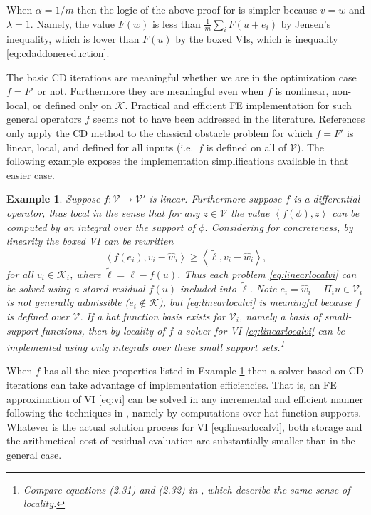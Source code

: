 \documentclass[letterpaper,final,12pt,reqno]{amsart}
\theoremstyle{cstyle}
\theoremstyle{cstyle*}
\theoremstyle{dstyle}
\newtheorem{example}[theorem]{Example}
\numberwithin{equation}{section}
\numberwithin{figure}{section}
\numberwithin{table}{section}
\numberwithin{theorem}{section}
\newcommand{\cK}{\mathcal{K}}
\newcommand{\cV}{\mathcal{V}}
\newcommand{\ip}[2]{\left<#1,#2\right>}
\begin{document}
When $\alpha=1/m$ then the logic of the above proof for  is simpler because $v=w$ and $\lambda=1$.  Namely, the value $F(w)$ is less than $\frac{1}{m} \sum_i F(u+e_i)$ by Jensen's inequality, which is lower than $F(u)$ by the boxed VIs, which is inequality \eqref{eq:cdaddonereduction}.

The basic CD iterations are meaningful whether we are in the optimization case $f=F'$ or not.  Furthermore they are meaningful even when $f$ is nonlinear, non-local, or defined only on $\cK$.  Practical and efficient FE implementation for such general operators $f$ seems not to have been addressed in the literature.  References \cite{GraeserKornhuber2009,Tai2003} only apply the CD method to the classical obstacle problem for which $f=F'$ is linear, local, and defined for all inputs (i.e.~$f$ is defined on all of $\mathcal{V}$).  The following example exposes the implementation simplifications available in that easier case.

\begin{example}  \label{ex:fnice} Suppose $f:\cV \to \cV'$ is linear.  Furthermore suppose $f$ is a differential operator, thus local in the sense that for any $z\in\mathcal{V}$ the value $\ip{f(\phi)}{z}$ can be computed by an integral over the support of $\phi$.  Considering  for concreteness, by linearity the boxed VI can be rewritten
\begin{equation}
\ip{f(e_i)}{v_i-\hat w_i} \ge \ip{\tilde\ell}{v_i-\hat w_i}, \label{eq:linearlocalvi}
\end{equation}
for all $v_i \in \mathcal{K}_i$, where $\tilde\ell = \ell - f(u)$.  Thus each problem \eqref{eq:linearlocalvi} can be solved using a stored residual $f(u)$ included into $\tilde\ell$.  Note $e_i = \hat w_i - \Pi_i u \in \cV_i$ is not generally admissible ($e_i \notin \cK$), but \eqref{eq:linearlocalvi} is meaningful because $f$ is defined over $\cV$.  If a hat function basis exists for $\cV_i$, namely a basis of small-support functions, then by locality of $f$ a solver for VI \eqref{eq:linearlocalvi} can be implemented using only integrals over these small support sets.\footnote{Compare equations (2.31) and (2.32) in \cite{Farrelletal2021}, which describe the same sense of locality.}
\end{example}

When $f$ has all the nice properties listed in Example \ref{ex:fnice} then a solver based on CD iterations can take advantage of implementation efficiencies.  That is, an FE approximation of VI \eqref{eq:vi} can be solved in any incremental and efficient manner following the techniques in \cite{GraeserKornhuber2009,Tai2003}, namely by computations over hat function supports.  Whatever is the actual solution process for VI \eqref{eq:linearlocalvi}, both storage and the arithmetical cost of residual evaluation are substantially smaller than in the general case.
\end{document}
